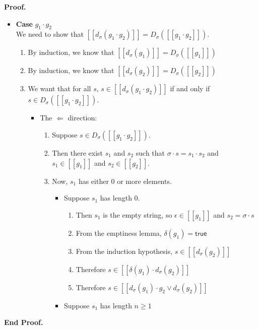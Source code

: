 \documentclass{article}
\newcommand{\true}{\mathsf{true}}
\newcommand{\interp}[1]{[\![{#1}]\!]}
\newcommand{\semderiv}[2]{D_{#1}({#2})}
\newcommand{\deriv}[2]{d_{#1}({#2})}
\newcommand{\emptify}[1]{\delta({#1})}
\newenvironment{proof}{\noindent\textbf{Proof.}}{\noindent\textbf{End Proof.}}
\newenvironment{caseblock}{\begin{itemize}}{\end{itemize}}
\newenvironment{case}[1]{\item \textbf{Case} {#1}\\}{}
\begin{document}
\begin{proof}
\begin{caseblock}
    \begin{case}{$g_1\cdot g_2$}
      We need to show that $\interp{\deriv{\sigma}{g_1\cdot g_2}} = \semderiv{\sigma}{\interp{g_1\cdot g_2}}$. 
      \begin{enumerate}
        \item By induction, we know that $\interp{\deriv{\sigma}{g_1}} = \semderiv{\sigma}{\interp{g_1}}$
        \item By induction, we know that $\interp{\deriv{\sigma}{g_2}} = \semderiv{\sigma}{\interp{g_2}}$
        \item We want that for all $s$, $s \in \interp{\deriv{\sigma}{g_1\cdot g_2}}$ if and 
          only if $s \in \semderiv{\sigma}{\interp{g_1\cdot g_2}}$. 
          \begin{itemize}
          \item The $\Leftarrow$ direction: 
            \begin{enumerate}
              \item Suppose $s \in \semderiv{\sigma}{\interp{g_1\cdot g_2}}$. 
              \item Then there exist $s_1$ and $s_2$ such that $\sigma\cdot s = s_1\cdot s_2$ and 
                $s_1 \in \interp{g_1}$ and $s_2 \in \interp{g_2}$. 
              \item Now, $s_1$ has either 0 or more elements. 
                \begin{itemize}
                  \item Suppose $s_1$ has length $0$. 
                    \begin{enumerate}
                      \item Then $s_1$ is the empty string, so $\epsilon \in \interp{g_1}$ and 
                            $s_2 = \sigma \cdot s$
                      \item From the emptiness lemma,  $\emptify{g_1} = \true$ 
                      \item From the induction hypothesis, $s \in \interp{\deriv{\sigma}{g_2}}$ 
                      \item Therefore $s \in \interp{\emptify{g_1}\cdot\deriv{\sigma}{g_2}}$
                      \item Therefore $s \in \interp{\deriv{\sigma}{g_1}\cdot g_2 \vee \deriv{\sigma}{g_2}}$
                  \end{enumerate}
                 \item Suppose $s_1$ has length $n \geq 1$ 
                   \begin{enumerate}

\end{enumerate}
\end{itemize}
\end{enumerate}
\end{itemize}
\end{enumerate}
\end{case}
\end{caseblock}
\end{proof}
\end{document}
